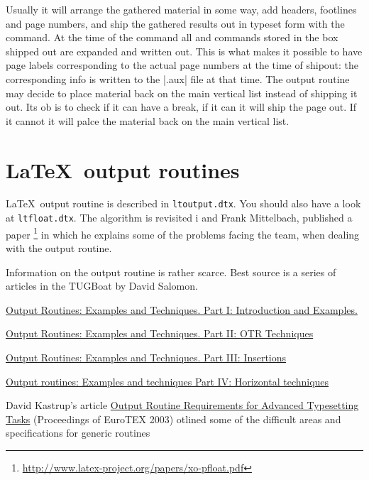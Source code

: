 Usually it will
arrange the gathered material in some way, add headers,
footlines and page numbers, and ship the gathered results out in typeset form with the  command.
At the time of the  command all  and
 commands stored in the box shipped out are expanded and written out. This is what makes it possible to have page labels corresponding to the actual page
numbers at the time of shipout: the corresponding info
is written to the |.aux| file at that time.
The output routine may decide to place material
back on the main vertical list instead of shipping it out. Its ob is to check if it can have a break, if it can it will ship the page out. If it cannot it will palce the material back on the main vertical list. 

\section{\LaTeX\  output routines}


\LaTeX\ output routine is described in \texttt{ltoutput.dtx}. You should also have a look at \texttt{ltfloat.dtx}. The algorithm is revisited i  and Frank Mittelbach, published a paper
\footnote{\protect\url{http://www.latex-project.org/papers/xo-pfloat.pdf}} in which he explains some of the problems facing the team, when dealing with the output routine.


Information on the output routine is rather scarce. Best source is a series of  articles in the TUGBoat by David Salomon.

\href{http://www.tug.org/TUGboat/Articles/tb11-1/tb27salomon.pdf}{Output Routines: Examples and Techniques. Part I: Introduction and Examples.}

\href{http://www.tug.org/TUGboat/Articles/tb11-2/tb28salomon.pdf}{Output Routines: Examples and Techniques. Part II: OTR Techniques}

\href{http://www.tug.org/TUGboat/Articles/tb11-4/tb30salomon.pdf}{Output Routines: Examples and Techniques. 
Part III: Insertions}

\href{http://www.tug.org/TUGboat/Articles/tb15-1/tb42salomon-output.pdf}{Output routines: Examples and techniques Part IV: Horizontal techniques}


David Kastrup's article \href{http://www.tug.org/TUGboat/Articles/tb24-3/kastrup.pdf}{Output Routine Requirements for Advanced Typesetting Tasks} (Proceedings of EuroTEX 2003) otlined some of the difficult areas and specifications for generic routines

